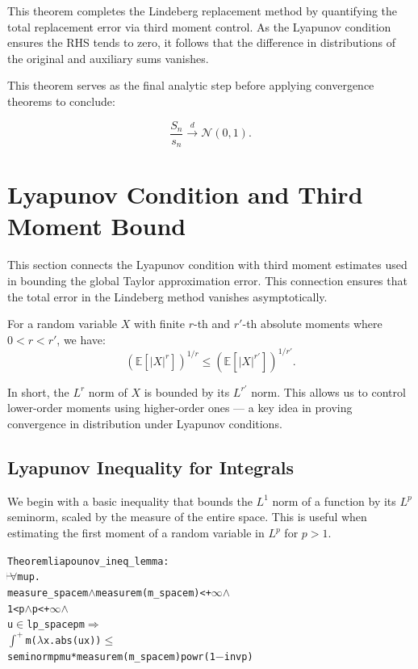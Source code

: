 This theorem completes the Lindeberg replacement method by quantifying the total replacement error via third moment control. As the Lyapunov condition ensures the RHS tends to zero, it follows that the difference in distributions of the original and auxiliary sums vanishes.

This theorem serves as the final analytic step before applying convergence theorems to conclude:

\[
\frac{S_n}{s_n} \xrightarrow{d} \mathcal{N}(0,1).
\]


\section{Lyapunov Condition and Third Moment Bound}

This section connects the Lyapunov condition with third moment estimates used in bounding the global Taylor approximation error. This connection ensures that the total error in the Lindeberg method vanishes asymptotically.

\begin{theorem}
  \label{thm:lyapunov-ineq}
  For a random variable $X$ with finite $r$-th and $r'$-th absolute moments where $0 < r < r'$, we have:
  \[
  \left( \mathbb{E}[|X|^r] \right)^{1/r} \le \left( \mathbb{E}[|X|^{r'}] \right)^{1/r'}.
  \]
\end{theorem}

In short, the $L^r$ norm of $X$ is bounded by its $L^{r'}$ norm. This allows us to control lower-order moments using higher-order ones — a key idea in proving convergence in distribution under Lyapunov conditions.


\subsection{Lyapunov Inequality for Integrals}

We begin with a basic inequality that bounds the $L^1$ norm of a function by its $L^p$ seminorm, scaled by the measure of the entire space. This is useful when estimating the first moment of a random variable in $L^p$ for $p > 1$.

\begin{hol}
\begin{alltt}
Theorem liapounov\_ineq\_lemma :
\(\!\!\!{\turn}\!\!\!\!\) \(\forall\)m u p.
measure\_space m \(\land\) measure m (m\_space m) < +\(\infty\) \(\land\)
1 < p \(\land\) p < +\(\infty\) \(\land\)
u \(\in\) lp\_space p m \(\Rightarrow\)
\(\int^+\) m (\(\lambda\)x. abs (u x)) \(\le\)
seminorm p m u * measure m (m\_space m) powr (1 \({-}\) inv p)
\end{alltt}
\end{hol}

